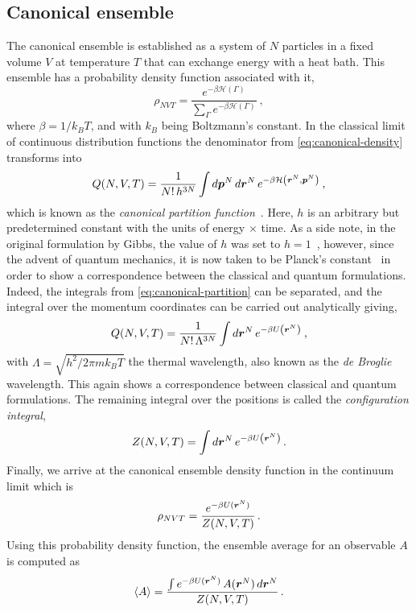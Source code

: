 \subsection{Canonical ensemble}
The canonical ensemble is established as a system of $N$ particles in a fixed volume $V$
at temperature $T$ that can exchange energy with a heat bath. This ensemble has a
probability density function associated with it,
\begin{equation}
    \rho_{NVT} = \frac{e^{-\beta \mathcal{H}(\Gamma)}}{\sum_{\Gamma} e^{-\beta \mathcal{H}(\Gamma)}}
    \: ,
    \label{eq:canonical-density}
\end{equation}
where $\beta=1/k_{B} T$, and with $k_{B}$ being Boltzmann's constant. 
In the classical limit of
continuous distribution functions the denominator from \autoref{eq:canonical-density}
transforms into
\begin{equation}
    Q(N,V,T) = \frac{1}{N! \, h^{3N}} \int d \bm{p}^{N} \, d \bm{r}^{N} \,
    e^{- \beta \mathcal{H} \left( \bm{r}^N, \bm{p}^N \right)}
    \: ,
    \label{eq:canonical-partition}
\end{equation}
which is known as the \emph{canonical partition function}~\cite{huangStatisticalMechanics1987}.
Here, $h$ is an arbitrary but predetermined constant with the units of energy $\times$
time. As a side note, in the original formulation by Gibbs, the value of $h$ was set
to $h=1$~\cite{gibbsElementaryPrinciplesStatistical2014}, however, since the advent
of quantum mechanics, it is now taken to be Planck's constant~\cite{tolmanPrinciplesStatisticalMechanics1979}
in order to show a correspondence between the classical and quantum formulations.
Indeed, the integrals from \autoref{eq:canonical-partition} can be separated, and the
integral over the momentum coordinates can be carried out analytically giving,
\begin{equation}
    Q(N,V,T) = \frac{1}{N! \, \Lambda^{3N}} \int d \bm{r}^{N} \,
    e^{- \beta U \left( \bm{r}^N \right)}
    \: ,
    \label{eq:canonical-partition-position}
\end{equation}
with $\Lambda=\sqrt{h^2 / 2 \pi m k_{B} T}$ the thermal wavelength, also known as the
\emph{de Broglie} wavelength. This again shows a correspondence between classical
and quantum formulations. The remaining integral over the positions is called the
\emph{configuration integral},
\begin{equation}
    Z(N,V,T) = \int d \bm{r}^{N} \, e^{- \beta U \left( \bm{r}^N \right)} \, .
    \label{eq:configuration-int}
\end{equation}
Finally, we arrive at the canonical ensemble density function in the continuum limit
which is
\begin{equation}
    \rho_{NVT} = \frac{e^{- \beta U(\bm{r}^{N})}}{Z(N,V,T)} \, .
    \label{eq:canonical-limit}
\end{equation}
Using this probability density function, the ensemble average for an observable $A$ is
computed as
\begin{equation}
    \left< A \right> = \frac{\int e^{- \beta U(\bm{r}^{N})} \, A(\bm{r}^{N}) \, d \bm{r}^{N}}{Z(N,V,T)} \, .
    \label{eq:average-canonical}
\end{equation}

